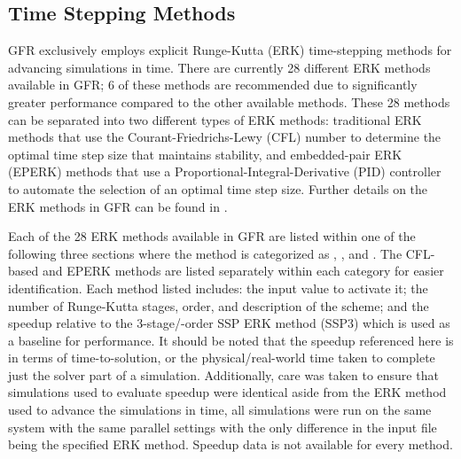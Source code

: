 \subsection{Time Stepping Methods}
\label{SEC:Time:Methods}

GFR exclusively employs explicit Runge-Kutta (ERK) time-stepping methods for
advancing simulations in time.
%
There are currently 28 different ERK methods available in GFR; 6 of these
methods are recommended due to significantly greater performance compared to the
other available methods.
%
These 28 methods can be separated into two different types of ERK methods:
traditional ERK methods that use the Courant-Friedrichs-Lewy (CFL) number to
determine the optimal time step size that maintains stability, and embedded-pair
ERK (EPERK) methods that use a Proportional-Integral-Derivative (PID) controller
to automate the selection of an optimal time step size.
%
Further details on the ERK methods in GFR can be found in
.


Each of the 28 ERK methods available in GFR are listed within one of the
following three sections where the method is categorized as
, , and .
%
The CFL-based and EPERK methods are listed separately within each category for
easier identification.
%
Each method listed includes:
the  input value
to activate it;
the number of Runge-Kutta stages, order, and description of the scheme; and
the speedup relative to the 3-stage/-order SSP ERK method (SSP3) which
is used as a baseline for performance.
%
%
It should be noted that the speedup referenced here is in terms of
time-to-solution, or the physical\slash real-world time taken to complete just
the solver part of a simulation.
%
Additionally, care was taken to ensure that simulations used to evaluate speedup
were identical aside from the ERK method used to advance the simulations in
time, \forexample all simulations were run on the same system with the same
parallel settings with the only difference in the input file being the specified
ERK method.
%
Speedup data is not available for every method.

